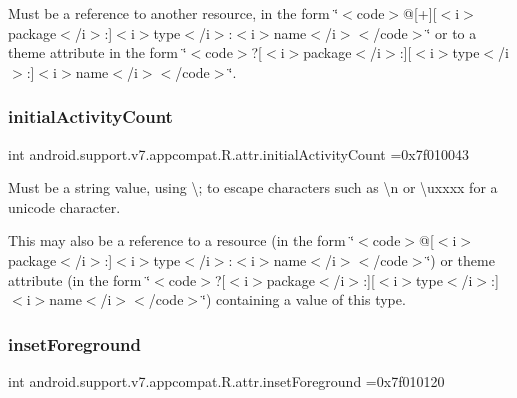 Must be a reference to another resource, in the form \char`\"{}$<$code$>$@\mbox{[}+\mbox{]}\mbox{[}$<$i$>$package$<$/i$>$\+:\mbox{]}$<$i$>$type$<$/i$>$\+:$<$i$>$name$<$/i$>$$<$/code$>$\char`\"{} or to a theme attribute in the form \char`\"{}$<$code$>$?\mbox{[}$<$i$>$package$<$/i$>$\+:\mbox{]}\mbox{[}$<$i$>$type$<$/i$>$\+:\mbox{]}$<$i$>$name$<$/i$>$$<$/code$>$\char`\"{}. \mbox{\label{classandroid_1_1support_1_1v7_1_1appcompat_1_1R_1_1attr_a05bd79550a679c584b4c3cddd8a08c7f}} 
\subsubsection{\texorpdfstring{initial\+Activity\+Count}{initialActivityCount}}
{\footnotesize\ttfamily int android.\+support.\+v7.\+appcompat.\+R.\+attr.\+initial\+Activity\+Count =0x7f010043\hspace{0.3cm}{\ttfamily [static]}}

Must be a string value, using \textquotesingle{}\textbackslash{};\textquotesingle{} to escape characters such as \textquotesingle{}\textbackslash{}n\textquotesingle{} or \textquotesingle{}\textbackslash{}uxxxx\textquotesingle{} for a unicode character. 

This may also be a reference to a resource (in the form \char`\"{}$<$code$>$@\mbox{[}$<$i$>$package$<$/i$>$\+:\mbox{]}$<$i$>$type$<$/i$>$\+:$<$i$>$name$<$/i$>$$<$/code$>$\char`\"{}) or theme attribute (in the form \char`\"{}$<$code$>$?\mbox{[}$<$i$>$package$<$/i$>$\+:\mbox{]}\mbox{[}$<$i$>$type$<$/i$>$\+:\mbox{]}$<$i$>$name$<$/i$>$$<$/code$>$\char`\"{}) containing a value of this type. \mbox{\label{classandroid_1_1support_1_1v7_1_1appcompat_1_1R_1_1attr_a5890e2c1d15e1bb94792c2f019dca401}} 
\subsubsection{\texorpdfstring{inset\+Foreground}{insetForeground}}
{\footnotesize\ttfamily int android.\+support.\+v7.\+appcompat.\+R.\+attr.\+inset\+Foreground =0x7f010120\hspace{0.3cm}{\ttfamily [static]}}

